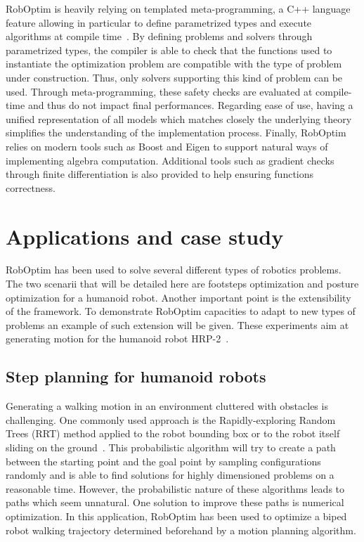 \documentclass[conference,final,a4paper,twocolumn,9pt]{IEEEtran}
\begin{document}
RobOptim is heavily relying on templated meta-programming, a C++
language feature allowing in particular to define parametrized types
and execute algorithms at compile time~\cite{iso14882}. By defining
problems and solvers through parametrized types, the compiler is able
to check that the functions used to instantiate the optimization
problem are compatible with the type of problem under
construction. Thus, only solvers supporting this kind of problem can
be used. Through meta-programming, these safety checks are evaluated
at compile-time and thus do not impact final performances. Regarding
ease of use, having a unified representation of all models which
matches closely the underlying theory simplifies the understanding of
the implementation process.  Finally, RobOptim relies on modern tools
such as Boost and Eigen to support natural ways of implementing
algebra computation. Additional tools such as gradient checks through
finite differentiation is also provided to help ensuring functions
correctness.


\section{Applications and case study}\label{sec:application}


RobOptim has been used to solve several different types of robotics
problems. The two scenarii that will be detailed here are footsteps
optimization and posture optimization for a humanoid robot. Another
important point is the extensibility of the framework. To demonstrate
RobOptim capacities to adapt to new types of problems an example of
such extension will be given. These experiments aim at generating
motion for the humanoid robot HRP-2~\cite{hrp2}.


\subsection{Step planning for humanoid robots}


Generating a walking motion in an environment cluttered with obstacles
is challenging. One commonly used approach is the Rapidly-exploring
Random Trees (RRT) method applied to the robot bounding box or to the
robot itself sliding on the ground~\cite{dalibard2011small}.  This
probabilistic algorithm will try to create a path between the starting
point and the goal point by sampling configurations randomly and is
able to find solutions for highly dimensioned problems on a reasonable
time. However, the probabilistic nature of these algorithms leads to
paths which seem unnatural. One solution to improve these paths is
numerical optimization. In this application, RobOptim has been used to
optimize a biped robot walking trajectory determined beforehand by a
motion planning algorithm.
\end{document}
